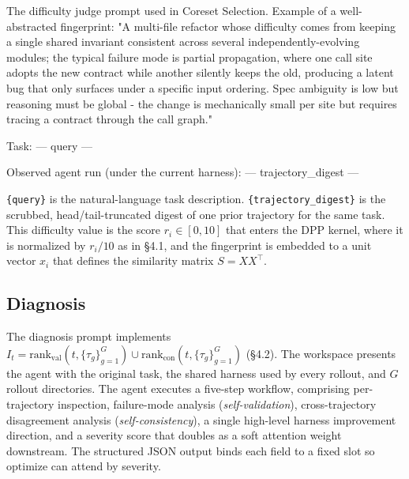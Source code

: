 \begin{promptbox}{The difficulty judge prompt used in Coreset Selection.}
Example of a well-abstracted fingerprint:
  "A multi-file refactor whose difficulty comes from keeping a single
  shared invariant consistent across several independently-evolving
  modules; the typical failure mode is partial propagation, where one
  call site adopts the new contract while another silently keeps the
  old, producing a latent bug that only surfaces under a specific
  input ordering. Spec ambiguity is low but reasoning must be global -
  the change is mechanically small per site but requires tracing a
  contract through the call graph."

Task:
---
{query}
---

Observed agent run (under the current harness):
---
{trajectory_digest}
---
\end{promptbox}

\noindent\texttt{\{query\}} is the natural-language task description.
\texttt{\{trajectory\_digest\}} is the scrubbed, head/tail-truncated
digest of one prior trajectory for the same task. This difficulty
value is the score $r_i \in [0,10]$ that enters the DPP
kernel, where it is normalized by $r_i/10$ as in \S 4.1, and the
fingerprint is embedded to a unit vector $x_i$ that defines the
similarity matrix $S = X X^\top$.

\subsection{Diagnosis}

The diagnosis prompt implements
$I_t = \mathrm{rank}_{\mathrm{val}}(t, \{\tau_g\}_{g=1}^{G}) \cup \mathrm{rank}_{\mathrm{con}}(t, \{\tau_g\}_{g=1}^{G})$ (\S 4.2). The
workspace presents the agent with the original task, the shared
harness used by every rollout, and $G$ rollout directories. The agent
executes a five-step workflow, comprising per-trajectory inspection, failure-mode
analysis (\emph{self-validation}), cross-trajectory disagreement
analysis (\emph{self-consistency}), a single high-level harness
improvement direction, and a severity score that doubles as a soft
attention weight downstream. The structured JSON output binds each
field to a fixed slot so $\mathrm{optimize}$ can attend by severity.

